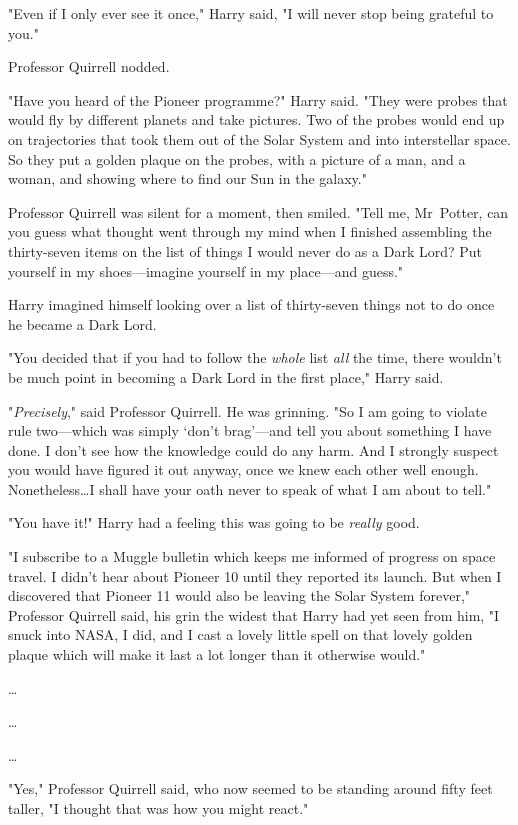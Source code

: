 "Even if I only ever see it once," Harry said, "I will never stop being
grateful to you."

Professor Quirrell nodded.

"Have you heard of the Pioneer programme?" Harry said. "They were probes that
would fly by different planets and take pictures. Two of the probes would end
up on trajectories that took them out of the Solar System and into interstellar
space. So they put a golden plaque on the probes, with a picture of a man, and
a woman, and showing where to find our Sun in the galaxy."

Professor Quirrell was silent for a moment, then smiled. "Tell me, Mr~Potter,
can you guess what thought went through my mind when I finished assembling the
thirty-seven items on the list of things I would never do as a Dark Lord? Put
yourself in my shoes—imagine yourself in my place—and guess."

Harry imagined himself looking over a list of thirty-seven things not to do
once he became a Dark Lord.

"You decided that if you had to follow the \emph{whole} list \emph{all} the
time, there wouldn't be much point in becoming a Dark Lord in the first place,"
Harry said.

"\emph{Precisely}," said Professor Quirrell. He was grinning. "So I am going to
violate rule two—which was simply `don't brag'—and tell you about something
I have done. I don't see how the knowledge could do any harm. And I strongly
suspect you would have figured it out anyway, once we knew each other well
enough. Nonetheless…I shall have your oath never to speak of what I am
about to tell."

"You have it!" Harry had a feeling this was going to be \emph{really} good.

"I subscribe to a Muggle bulletin which keeps me informed of progress on space
travel. I didn't hear about Pioneer 10 until they reported its launch. But when
I discovered that Pioneer 11 would also be leaving the Solar System forever,"
Professor Quirrell said, his grin the widest that Harry had yet seen from him,
"I snuck into NASA, I did, and I cast a lovely little spell on that lovely
golden plaque which will make it last a lot longer than it otherwise would."

…

…

…

"Yes," Professor Quirrell said, who now seemed to be standing around fifty feet
taller, "I thought that was how you might react."

